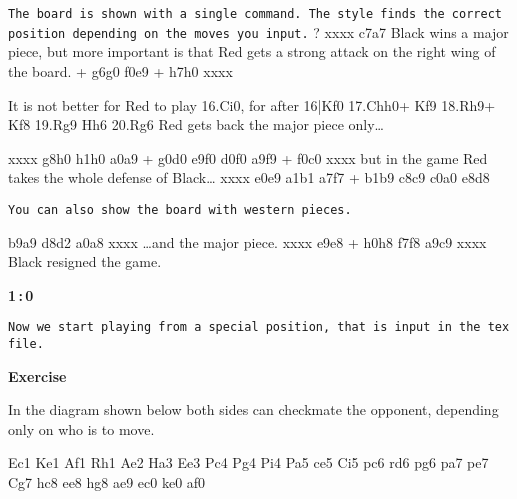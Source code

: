 \documentclass[twocolumn,11pt]{article}
\begin{document}
\newpage

\showboard 
\texttt{The board is shown with a single command. The style finds the correct position depending on the moves you input.}
\bigskip
\cb ? 
\move xxxx c7a7 
Black wins a major piece, but more important is that Red gets a strong attack on the right wing of the board.
\cr + 
\move g6g0 f0e9
\cr +
\move h7h0 xxxx 

It is not better for Red to play \bv 16.Ci0, for after 16|Kf0 17.Chh0+ Kf9 18.Rh9+ Kf8 19.Rg9 Hh6 20.Rg6 \ev Red gets back the major  piece only\dots %

\move xxxx g8h0
\move h1h0 a0a9
\cr +
\move g0d0 e9f0
\move d0f0 a9f9
\cr +
\move f0c0 xxxx 
but in the game Red takes the whole defense of Black\dots 
\move xxxx e0e9
\move a1b1 a7f7
\cr + 
\move b1b9 c8c9
\move c0a0 e8d8

\newpage

\showwesternboard

\texttt{You can also show the board with western pieces.}
\bigskip

\move b9a9 d8d2
\move a0a8 xxxx
\dots and the major piece.
\move xxxx e9e8
\cr +
\move h0h8 f7f8
\move a9c9 xxxx
Black resigned the game.
\begin{center}
{\bf{\large{1\,:\,0}}}
\end{center}

\newpage
\newpage

\texttt{Now we start playing from a special position, that is input in the tex file.}

\begin{center}
{\bf{\large{Exercise}}}
\end{center}
In the diagram shown below both sides can checkmate the opponent, depending only on who is to move.

\resetboard 

\piece Ec1
\piece Ke1
\piece Af1
\piece Rh1
\piece Ae2
\piece Ha3
\piece Ee3
\piece Pc4
\piece Pg4
\piece Pi4
\piece Pa5
\piece ce5
\piece Ci5
\piece pc6
\piece rd6
\piece pg6
\piece pa7
\piece pe7
\piece Cg7
\piece hc8
\piece ee8
\piece hg8
\piece ae9
\piece ec0
\piece ke0
\piece af0
\end{document}
